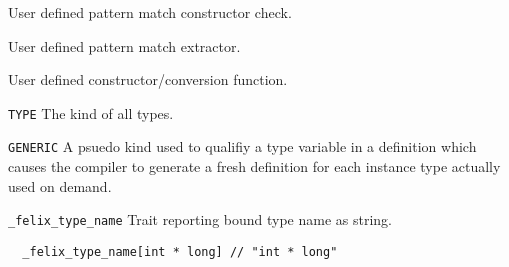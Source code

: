\documentclass[oneside]{book}
\begin{document}
\begin{description}
\item[{\tt \_match\_ctor\_}name]
User defined pattern match constructor check.

\item[{\tt \_ctor\_arg\_}name]
User defined pattern match extractor.


\item[{\tt \_ctor\_arg\_}typename]
User defined constructor/conversion function.

\item{{\tt TYPE}}
The kind of all types.

\item{{\tt GENERIC}}
A psuedo kind used to qualifiy a type variable
in a definition which causes the compiler to generate
a fresh definition for each instance type actually
used on demand.

\item{{\tt \_felix\_type\_name}}
Trait reporting bound type name as string.
\begin{verbatim}
  _felix_type_name[int * long] // "int * long"
\end{verbatim}

\end{description}

\clearpage
\printglossaries
\clearpage
{}
\printindex
\backmatter
\end{document}
